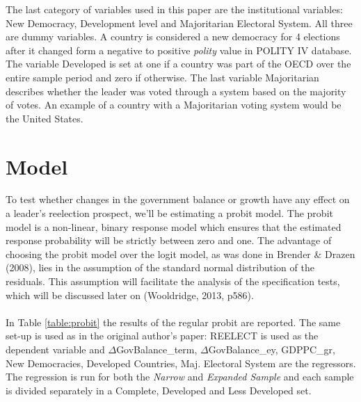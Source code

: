 \documentclass[12pt]{article}
\begin{document}
The last category of variables used in this paper are the institutional variables: New Democracy, Development level and Majoritarian Electoral System. All three are dummy variables. A country is considered a new democracy for 4 elections after it changed form a negative to positive \textit{polity} value in POLITY IV database. The variable Developed is set at one if a country was part of the OECD over the entire sample period and zero if otherwise. The last variable Majoritarian describes whether the leader was voted through a system based on the majority of votes. An example of a country with a Majoritarian voting system would be the United States.\\

\section{Model}
To test whether changes in the government balance or growth have any effect on a leader's reelection prospect, we'll be estimating a probit model. The probit model is a non-linear, binary response model which ensures that the estimated response probability will be strictly between zero and one. The advantage of choosing the probit model over the logit model, as was done in Brender \& Drazen (2008), lies in the assumption of the standard normal distribution of the residuals. This assumption will facilitate the analysis of the specification tests, which will be discussed later on (Wooldridge, 2013, p586). \\
\\
In Table \ref{table:probit} the results of the regular probit are reported. The same set-up is used as in the original author's paper: REELECT is used as the dependent variable and $\Delta$GovBalance\_term, $\Delta$GovBalance\_ey, GDPPC\_gr, New Democracies, Developed Countries, Maj. Electoral System are the regressors. The regression is run for both the \textit{Narrow} and \textit{Expanded Sample} and each sample is divided separately in a Complete, Developed and Less Developed set.\\
\end{document}
